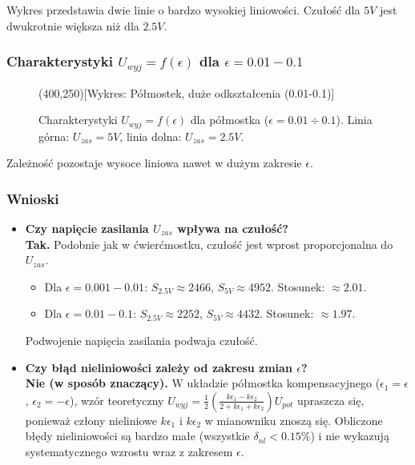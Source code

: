 \documentclass[12pt, a4paper]{article}
\begin{document}
	Wykres przedstawia dwie linie o bardzo wysokiej liniowości. Czułość dla $5 V$ jest dwukrotnie większa niż dla $2.5 V$.
	
	\subsubsection{Charakterystyki $U_{wyj} = f(\epsilon)$ dla $\epsilon = 0.01-0.1$}
	
	\begin{figure}[H]
		\centering
		\framebox(400,250){[Wykres: Półmostek, duże odkształcenia (0.01-0.1)]}
		\caption{Charakterystyki $U_{wyj} = f(\epsilon)$ dla półmostka ($\epsilon = 0.01 \div 0.1$).  Linia górna: $U_{zas} = 5 V$, linia dolna: $U_{zas} = 2.5 V$.}
	\end{figure}
	
	Zależność pozostaje wysoce liniowa nawet w dużym zakresie $\epsilon$.
	
	\subsubsection{Wnioski}
	
	\begin{itemize}
		\item \textbf{Czy napięcie zasilania $U_{zas}$ wpływa na czułość?} \\
		\textbf{Tak.} Podobnie jak w ćwierćmostku, czułość jest wprost proporcjonalna do $U_{zas}$.
		\begin{itemize}
			\item Dla $\epsilon=0.001-0.01$: $S_{2.5V} \approx 2466$, $S_{5V} \approx 4952$. Stosunek: $\approx 2.01$.
			\item Dla $\epsilon=0.01-0.1$: $S_{2.5V} \approx 2252$, $S_{5V} \approx 4432$. Stosunek: $\approx 1.97$.
		\end{itemize}
		Podwojenie napięcia zasilania podwaja czułość.
		
		\item \textbf{Czy błąd nieliniowości zależy od zakresu zmian $\epsilon$?} \\
		 \textbf{Nie (w sposób znaczący).} W układzie półmostka kompensacyjnego ($\epsilon_1 = \epsilon$, $\epsilon_2 = -\epsilon$), wzór teoretyczny $U_{wyj}=\frac{1}{2}(\frac{k\epsilon_1 - k\epsilon_2}{2+k\epsilon_1+k\epsilon_2})U_{pot}$ upraszcza się, ponieważ człony nieliniowe $k\epsilon_1$ i $k\epsilon_2$ w mianowniku znoszą się. Obliczone błędy nieliniowości są bardzo małe (wszystkie $\delta_{nl} < 0.15 \%$) i nie wykazują systematycznego wzrostu wraz z zakresem $\epsilon$.
	\end{itemize}
	
\end{document}
